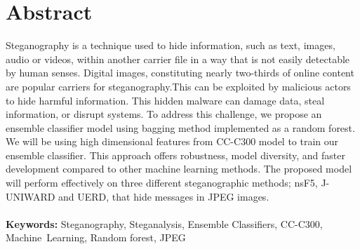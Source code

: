 \chapter*{Abstract}
\thispagestyle{plain}
\setcounter{page}{4}
\sloppy
Steganography is a technique used to hide information, such as text, images, audio or videos, within another carrier file in a way that is not easily detectable by human senses. Digital images, constituting nearly two-thirds of online content are popular carriers for steganography.This can be exploited by malicious actors to hide harmful information. This hidden malware can damage data, steal information, or disrupt systems. To address this challenge, we propose an ensemble classifier model using bagging method implemented as a random forest. We will be using high dimensional features from CC-C300 model to train our ensemble classifier. This approach offers robustness, model diversity, and faster development compared to other machine learning methods. The proposed model will perform effectively on three different steganographic methods; nsF5, J-UNIWARD and UERD, that hide messages in JPEG images.\\ \\
\normalsize{\textbf{Keywords:} Steganography, Steganalysis, Ensemble Classifiers, CC-C300, \mbox{Machine Learning}, Random forest, JPEG }


